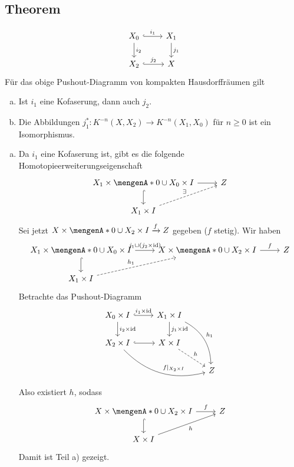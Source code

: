 \subsection{Theorem} %
\label{sub:39}
\[
	\begin{tikzcd}
		X_0 \rar[hook,"i_1"] \dar["i_2"]& X_1 \dar["j_1"] \\
		X_2 \rar[hook,"j_2"] & X
	\end{tikzcd}
\]
Für das obige Pushout-Diagramm von kompakten Hausdorffräumen gilt
\begin{enumerate}[a)]
	\item Ist $i_1$ eine Kofaserung, dann auch $j_2$.
	\item Die Abbildungen $j_1^* \colon K^{-n}(X,X_2) \to K^{-n}(X_1,X_0)$ für $n \ge 0$ ist ein Isomorphismus.
\end{enumerate}
\begin{enumerate}[a)]
	\item Da $i_1$ eine Kofaserung ist, gibt es die folgende Homotopieerweiterungseigenschaft
	\[
		\begin{tikzcd}
			X_1 \times \set{0} \cup X_0 \times I \rar \dar[hook] & Z \\
			X_1 \times I \urar[dashed,"\exists"] 
		\end{tikzcd}
	\]
	Sei jetzt $X \times \set{0} \cup X_2 \times I \xrightarrow{f} Z$ gegeben ($f$ stetig). Wir haben 
	\[
		\begin{tikzcd}
			X_1 \times \set{0} \cup X_0 \times I \rar["{j_1 \cup (j_2 \times \id)}"] \dar[hook] & X \times \set{0} \cup X_2 \times I \rar["f"] & Z \\
			X_1 \times I \ar[ur, dashed,"h_1"] & & 
		\end{tikzcd}
	\]
	Betrachte das Pushout-Diagramm
	\[
		\begin{tikzcd}
			X_0 \times I \rar[hook,"i_1 \times \id"] \dar["i_2 \times \id"] & X_1 \times I \dar["j_1 \times \id"] \ar[ddr, bend left,"h_1"] \\
			X_2 \times I \rar[hook] \ar[drr, bend right,"f|_{X_2 \times I}"] & X \times I \drar[dashed,"h"] \\
			& & Z
		\end{tikzcd}
	\]
	Also existiert $h$, sodass
	\[
		\begin{tikzcd}
			X \times \set{0} \cup X_2 \times I \rar["f"] \dar[hook]& Z \\
			X \times I \urar["h"'] 
		\end{tikzcd}
	\]
	Damit ist Teil a) gezeigt.
\end{enumerate}


